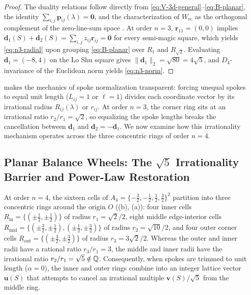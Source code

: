 \begin{proof}
The duality relations follow directly from \eqref{eq:V-3d-general}--\eqref{eq:B-planar}, the identity $\sum_{i,j}\mathbf p_{ij}(\lambda)=\mathbf 0$, and the characterization of $W_{\mathrm{rc}}$ as the orthogonal complement of the zero-line-sum space \citep{mathewson2026moments}. At order $n=3$, $\mathbf r_{11}=(0,0)$ implies $\mathbf d_1(S)+\mathbf d_2(S)=\sum_{i,j}z_{ij}\mathbf r_{ij}=\mathbf 0$ for every semi-magic square, which yields \eqref{eq:n3-radial} upon grouping \eqref{eq:B-planar} over $R_1$ and $R_{\sqrt{2}}$. Evaluating $\mathbf d_1=(-8,4)$ on the Lo Shu square gives $\|\mathbf d_1\|_2=\sqrt{80}=4\sqrt{5}$, and $D_4$-invariance of the Euclidean norm yields \eqref{eq:n3-norm}.
\end{proof}

 makes the mechanics of spoke normalization transparent: forcing unequal spokes to equal unit length ($L_{ij}=1$ or $\ell=1$) divides each coordinate vector by its irrational radius $R_{ij}(\lambda)$ or $r_{ij}$. At order $n=3$, the corner ring sits at an irrational ratio $r_2/r_1=\sqrt{2}$, so equalizing the spoke lengths breaks the cancellation between $\mathbf d_1$ and $\mathbf d_2=-\mathbf d_1$. We now examine how this irrationality mechanism operates across the three concentric rings of order $n=4$.

\subsection{Planar Balance Wheels: The \texorpdfstring{$\sqrt{5}$}{sqrt(5)} Irrationality Barrier and Power-Law Restoration}

At order $n=4$, the sixteen cells of $A_4=\{-\frac32,-\frac12,\frac12,\frac32\}^2$ partition into three concentric rings around the origin $O$ ((b), (a)): four inner cells $R_{\mathrm{in}}=\{(\pm\tfrac12,\pm\tfrac12)\}$ of radius $r_1=\sqrt{2}/2$, eight middle edge-interior cells $R_{\mathrm{mid}}=\{(\pm\tfrac32,\pm\tfrac12),(\pm\tfrac12,\pm\tfrac32)\}$ of radius $r_2=\sqrt{10}/2$, and four outer corner cells $R_{\mathrm{out}}=\{(\pm\tfrac32,\pm\tfrac32)\}$ of radius $r_3=3\sqrt{2}/2$. Whereas the outer and inner radii have a rational ratio $r_3/r_1=3$, the middle and inner radii have the irrational ratio $r_2/r_1=\sqrt{5}\notin\mathbb{Q}$. Consequently, when spokes are trimmed to unit length ($\alpha=0$), the inner and outer rings combine into an integer lattice vector $\mathbf u(S)$ that attempts to cancel an irrational multiple $\mathbf v(S)/\sqrt{5}$ from the middle ring.

